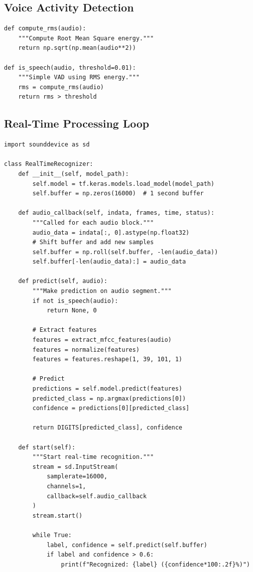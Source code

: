 \documentclass[a4paper,12pt]{article}
\begin{document}
\subsection{Voice Activity Detection}
\begin{lstlisting}[style=pythonstyle]
def compute_rms(audio):
    """Compute Root Mean Square energy."""
    return np.sqrt(np.mean(audio**2))

def is_speech(audio, threshold=0.01):
    """Simple VAD using RMS energy."""
    rms = compute_rms(audio)
    return rms > threshold
\end{lstlisting}

\subsection{Real-Time Processing Loop}
\begin{lstlisting}[style=pythonstyle]
import sounddevice as sd

class RealTimeRecognizer:
    def __init__(self, model_path):
        self.model = tf.keras.models.load_model(model_path)
        self.buffer = np.zeros(16000)  # 1 second buffer
        
    def audio_callback(self, indata, frames, time, status):
        """Called for each audio block."""
        audio_data = indata[:, 0].astype(np.float32)
        # Shift buffer and add new samples
        self.buffer = np.roll(self.buffer, -len(audio_data))
        self.buffer[-len(audio_data):] = audio_data
    
    def predict(self, audio):
        """Make prediction on audio segment."""
        if not is_speech(audio):
            return None, 0
        
        # Extract features
        features = extract_mfcc_features(audio)
        features = normalize(features)
        features = features.reshape(1, 39, 101, 1)
        
        # Predict
        predictions = self.model.predict(features)
        predicted_class = np.argmax(predictions[0])
        confidence = predictions[0][predicted_class]
        
        return DIGITS[predicted_class], confidence
    
    def start(self):
        """Start real-time recognition."""
        stream = sd.InputStream(
            samplerate=16000,
            channels=1,
            callback=self.audio_callback
        )
        stream.start()
        
        while True:
            label, confidence = self.predict(self.buffer)
            if label and confidence > 0.6:
                print(f"Recognized: {label} ({confidence*100:.2f}%)")
\end{lstlisting}
\end{document}
